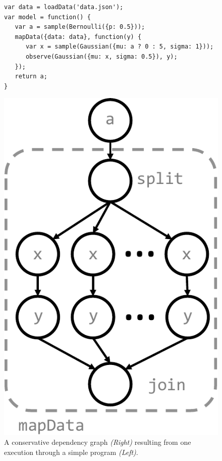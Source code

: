 \begin{figure}[!ht]
\begin{minipage}{0.65\linewidth}
\begin{lstlisting}
var data = loadData('data.json');
var model = function() {
   var a = sample(Bernoulli({p: 0.5}));
   mapData({data: data}, function(y) {
      var x = sample(Gaussian({mu: a ? 0 : 5, sigma: 1}));
      observe(Gaussian({mu: x, sigma: 0.5}), y);
   });
   return a;
}
\end{lstlisting}
\end{minipage}
%
\begin{minipage}{0.35\linewidth}
\centering
\includegraphics[width=\linewidth]{figs/graphExample.pdf}
\end{minipage}
\caption{A conservative dependency graph \emph{(Right)} resulting from one execution through a simple program \emph{(Left)}.}
\label{fig:graphExample}
\end{figure}

